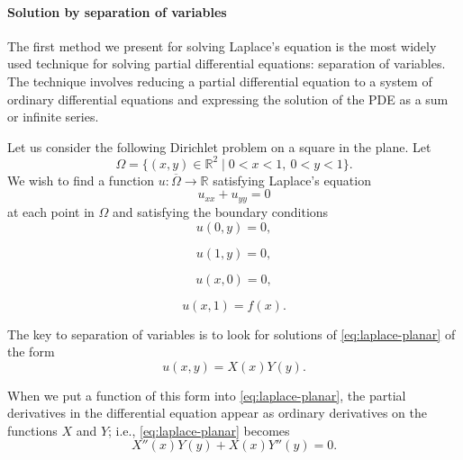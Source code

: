 \paragraph*{Solution by separation of variables}

The first method we present for solving Laplace's equation is the most widely used technique for solving partial differential equations: separation of variables. The technique involves reducing a partial differential equation to a system of ordinary differential equations and expressing the solution of the PDE as a sum or infinite series.

Let us consider the following Dirichlet problem on a square in the plane. Let
\[
\Omega=\{(x,y)\in\mathbb{R}^2\mid 0<x<1,\ 0<y<1\}.
\]
We wish to find a function $u:\overline\Omega\to\mathbb{R}$ satisfying Laplace's equation
\begin{equation}\label{eq:laplace-planar}
u_{xx}+u_{yy}=0
\end{equation}
at each point in $\Omega$ and satisfying the boundary conditions
\begin{equation}\label{eq:square-left-boundary}
u(0,y)=0,
\end{equation}

\begin{equation}\label{eq:square-right-boundary}
u(1,y)=0,
\end{equation}

\begin{equation}\label{eq:square-bottom-boundary}
u(x,0)=0,
\end{equation}

\begin{equation}\label{eq:square-top-boundary}
u(x,1)=f(x).
\end{equation}


The key to separation of variables is to look for solutions of \eqref{eq:laplace-planar} of the form
\begin{equation}\label{eq:laplace-separated-product}
u(x,y)=X(x)Y(y).
\end{equation}


When we put a function of this form into \eqref{eq:laplace-planar}, the partial derivatives in the differential equation appear as ordinary derivatives on the functions $X$ and $Y$; i.e., \eqref{eq:laplace-planar} becomes
\begin{equation}\label{eq:laplace-product-substitution}
X''(x)Y(y)+X(x)Y''(y)=0.
\end{equation}


